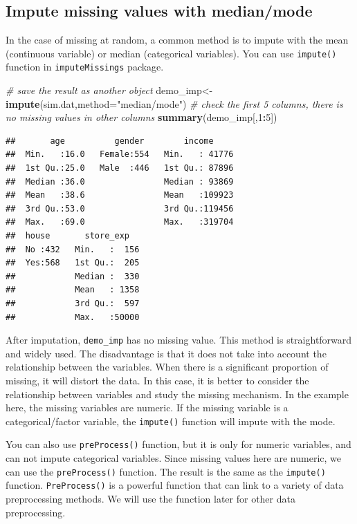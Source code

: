 \documentclass[12pt,]{krantz}
\newenvironment{Shaded}{\begin{snugshade}}{\end{snugshade}}
\newcommand{\KeywordTok}[1]{\textcolor[rgb]{0.13,0.29,0.53}{\textbf{#1}}}
\newcommand{\DataTypeTok}[1]{\textcolor[rgb]{0.13,0.29,0.53}{#1}}
\newcommand{\DecValTok}[1]{\textcolor[rgb]{0.00,0.00,0.81}{#1}}
\newcommand{\StringTok}[1]{\textcolor[rgb]{0.31,0.60,0.02}{#1}}
\newcommand{\CommentTok}[1]{\textcolor[rgb]{0.56,0.35,0.01}{\textit{#1}}}
\newcommand{\OperatorTok}[1]{\textcolor[rgb]{0.81,0.36,0.00}{\textbf{#1}}}
\newcommand{\NormalTok}[1]{#1}
\theoremstyle{definition}
\theoremstyle{definition}
\theoremstyle{definition}
\theoremstyle{remark}
\begin{document}
\subsection{Impute missing values with
median/mode}\label{impute-missing-values-with-medianmode}

In the case of missing at random, a common method is to impute with the
mean (continuous variable) or median (categorical variables). You can
use \texttt{impute()} function in \texttt{imputeMissings} package.

\begin{Shaded}
\begin{Highlighting}[]
\CommentTok{# save the result as another object}
\NormalTok{demo_imp<-}\KeywordTok{impute}\NormalTok{(sim.dat,}\DataTypeTok{method=}\StringTok{"median/mode"}\NormalTok{)}
\CommentTok{# check the first 5 columns, there is no missing values in other columns}
\KeywordTok{summary}\NormalTok{(demo_imp[,}\DecValTok{1}\OperatorTok{:}\DecValTok{5}\NormalTok{])}
\end{Highlighting}
\end{Shaded}

\begin{verbatim}
##       age          gender        income      
##  Min.   :16.0   Female:554   Min.   : 41776  
##  1st Qu.:25.0   Male  :446   1st Qu.: 87896  
##  Median :36.0                Median : 93869  
##  Mean   :38.6                Mean   :109923  
##  3rd Qu.:53.0                3rd Qu.:119456  
##  Max.   :69.0                Max.   :319704  
##  house       store_exp    
##  No :432   Min.   :  156  
##  Yes:568   1st Qu.:  205  
##            Median :  330  
##            Mean   : 1358  
##            3rd Qu.:  597  
##            Max.   :50000
\end{verbatim}

After imputation, \texttt{demo\_imp} has no missing value. This method
is straightforward and widely used. The disadvantage is that it does not
take into account the relationship between the variables. When there is
a significant proportion of missing, it will distort the data. In this
case, it is better to consider the relationship between variables and
study the missing mechanism. In the example here, the missing variables
are numeric. If the missing variable is a categorical/factor variable,
the \texttt{impute()} function will impute with the mode.

You can also use \texttt{preProcess()} function, but it is only for
numeric variables, and can not impute categorical variables. Since
missing values here are numeric, we can use the \texttt{preProcess()}
function. The result is the same as the \texttt{impute()} function.
\texttt{PreProcess()} is a powerful function that can link to a variety
of data preprocessing methods. We will use the function later for other
data preprocessing.
\end{document}

